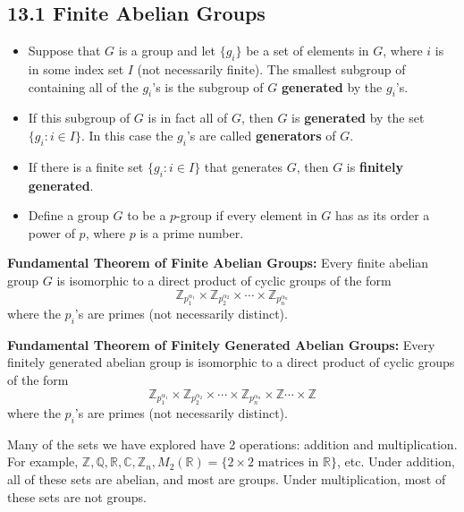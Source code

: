 \documentclass{article}
\newcommand{\R}{\mathbb{R}}
\newcommand{\Z}{\mathbb{Z}}
\newcommand{\Q}{\mathbb{Q}}
\newcommand{\C}{\mathbb{C}}
\begin{document}
\subsection{13.1 Finite Abelian Groups}
\begin{itemize}
  \item Suppose that $G$ is a group and let $\{g_i\}$ be a set of elements in $G$, where $i$ is in some index set $I$ (not necessarily finite). The smallest subgroup of containing all of the $g_i$'s is the subgroup of $G$ \textbf{generated} by the $g_i$'s.
  \item If this subgroup of $G$ is in fact all of $G$, then $G$ is \textbf{generated} by the set $\{g_i:i\in I\}$. In this case the $g_i$'s are called \textbf{generators} of $G$.
  \item If there is a finite set $\{g_i:i\in I\}$ that generates $G$, then $G$ is \textbf{finitely generated}.
  \item Define a group $G$ to be a $p$-group if every element in $G$ has as its order a power of $p$, where $p$ is a prime number.
\end{itemize}
\begin{theorem}
  \textbf{Fundamental Theorem of Finite Abelian Groups:} Every finite abelian group $G$ is isomorphic to a direct product of cyclic groups of the form \[\Z_{p_1^{\alpha_1}}\times\Z_{p_2^{\alpha_2}}\times\cdots\times\Z_{p_n^{\alpha_n}}\]where the $p_i$'s are primes (not necessarily distinct).
\end{theorem}
\begin{theorem}
  \textbf{Fundamental Theorem of Finitely Generated Abelian Groups:} Every finitely generated abelian group is isomorphic to a direct product of cyclic groups of the form \[\Z_{p_1^{\alpha_1}}\times\Z_{p_2^{\alpha_2}}\times\cdots\times\Z_{p_n^{\alpha_n}}\times\Z\cdots\times\Z\] where the $p_i$'s are primes (not necessarily distinct).
\end{theorem}

Many of the sets we have explored have 2 operations: addition and multiplication. For example, $\Z,\Q,\R,\C,\Z_n,M_2(\R)=\{2\times2\text{ matrices in }\R\}$, etc. Under addition, all of these sets are abelian, and most are groups. Under multiplication, most of these sets are not groups.
\end{document}
